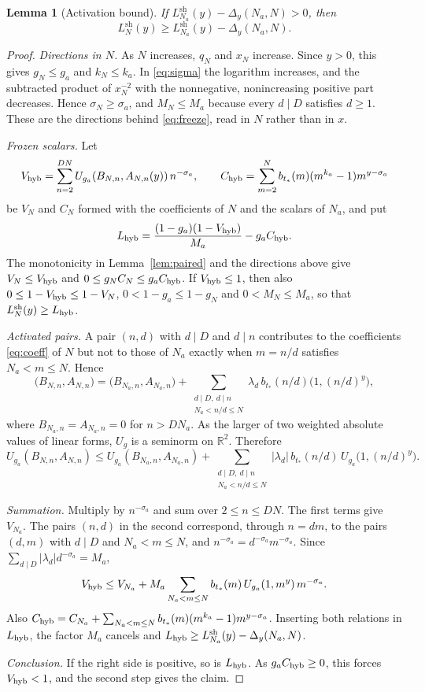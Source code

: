 \documentclass[11pt]{article}
\newtheorem{lemma}[theorem]{Lemma}
\theoremstyle{remark}
\newcommand{\R}{\mathbb R}
\newcommand{\tstar}{t_*}
\numberwithin{equation}{section}
\begin{document}
\begin{lemma}[Activation bound]\label{lem:activation}
If $L^{\mathrm{sh}}_{N_a}(y)-\Delta_y(N_a,N)>0$, then
\[
 L^{\mathrm{sh}}_N(y)\ge L^{\mathrm{sh}}_{N_a}(y)-\Delta_y(N_a,N).
\]
\end{lemma}
\begin{proof}
\emph{Directions in $N$.} As $N$ increases, $q_N$ and $x_N$ increase.
Since $y>0$, this gives $g_N\le g_a$ and $k_N\le k_a$. In
\eqref{eq:sigma} the logarithm increases, and the subtracted product of
$x_N^{-2}$ with the nonnegative, nonincreasing positive part decreases.
Hence $\sigma_N\ge\sigma_a$, and $M_N\le M_a$ because every $d\mid D$
satisfies $d\ge1$. These are the directions behind \eqref{eq:freeze},
read in $N$ rather than in $x$.

\emph{Frozen scalars.} Let
\[
 V_{\rm hyb}=\sum_{n=2}^{DN}U_{g_a}(B_{N,n},A_{N,n}(y))\,n^{-\sigma_a},
 \qquad
 C_{\rm hyb}=\sum_{m=2}^{N}b_{\tstar}(m)(m^{k_a}-1)m^{y-\sigma_a}
\]
be $V_N$ and $C_N$ formed with the coefficients of $N$ and the scalars of
$N_a$, and put
\[
 L_{\rm hyb}=\frac{(1-g_a)(1-V_{\rm hyb})}{M_a}-g_aC_{\rm hyb}.
\]
The monotonicity in Lemma~\ref{lem:paired} and the directions above give
$V_N\le V_{\rm hyb}$ and $0\le g_NC_N\le g_aC_{\rm hyb}$. If
$V_{\rm hyb}\le1$, then also $0\le1-V_{\rm hyb}\le1-V_N$,
$0<1-g_a\le1-g_N$ and $0<M_N\le M_a$, so that
$L^{\mathrm{sh}}_N(y)\ge L_{\rm hyb}$.

\emph{Activated pairs.} A pair $(n,d)$ with $d\mid D$ and $d\mid n$
contributes to the coefficients \eqref{eq:coeff} of $N$ but not to those
of $N_a$ exactly when $m=n/d$ satisfies $N_a<m\le N$. Hence
\[
 \bigl(B_{N,n},A_{N,n}\bigr)=\bigl(B_{N_a,n},A_{N_a,n}\bigr)
 +\sum_{\substack{d\mid D,\ d\mid n\\ N_a<n/d\le N}}
 \lambda_d\,b_{\tstar}(n/d)\bigl(1,(n/d)^y\bigr),
\]
where $B_{N_a,n}=A_{N_a,n}=0$ for $n>DN_a$. As the larger of two
weighted absolute values of linear forms, $U_g$ is a seminorm on $\R^2$.
Therefore
\[
 U_{g_a}(B_{N,n},A_{N,n})\le U_{g_a}(B_{N_a,n},A_{N_a,n})
 +\sum_{\substack{d\mid D,\ d\mid n\\ N_a<n/d\le N}}
 |\lambda_d|\,b_{\tstar}(n/d)\,U_{g_a}\bigl(1,(n/d)^y\bigr).
\]

\emph{Summation.} Multiply by $n^{-\sigma_a}$ and sum over
$2\le n\le DN$. The first terms give $V_{N_a}$. The pairs $(n,d)$ in the
second correspond, through $n=dm$, to the pairs $(d,m)$ with $d\mid D$
and $N_a<m\le N$, and $n^{-\sigma_a}=d^{-\sigma_a}m^{-\sigma_a}$. Since
$\sum_{d\mid D}|\lambda_d|d^{-\sigma_a}=M_a$,
\[
 V_{\rm hyb}\le V_{N_a}+M_a\sum_{N_a<m\le N}b_{\tstar}(m)\,
 U_{g_a}(1,m^y)\,m^{-\sigma_a}.
\]
Also $C_{\rm hyb}=C_{N_a}+\sum_{N_a<m\le N}b_{\tstar}(m)(m^{k_a}-1)
m^{y-\sigma_a}$. Inserting both relations in $L_{\rm hyb}$, the factor
$M_a$ cancels and
$L_{\rm hyb}\ge L^{\mathrm{sh}}_{N_a}(y)-\Delta_y(N_a,N)$.

\emph{Conclusion.} If the right side is positive, so is $L_{\rm hyb}$.
As $g_aC_{\rm hyb}\ge0$, this forces $V_{\rm hyb}<1$, and the second step
gives the claim.
\end{proof}
\end{document}
